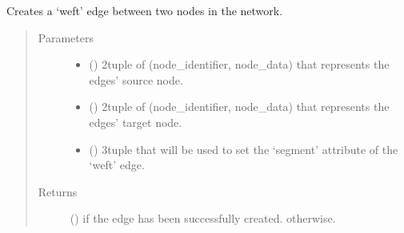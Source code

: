 \documentclass[letterpaper,10pt,english]{sphinxmanual}
\begin{document}
\begin{fulllineitems}

\begin{fulllineitems}
\label{\detokenize{cockatoo:cockatoo.KnitNetworkBase.create_weft_edge}}
Creates a ‘weft’ edge between two nodes in the network.
\begin{quote}\begin{description}
\item[{Parameters}] \leavevmode\begin{itemize}
\item {} 
 () \textendash{} 2\sphinxhyphen{}tuple of (node\_identifier, node\_data) that represents the edges’
source node.

\item {} 
 () \textendash{} 2\sphinxhyphen{}tuple of (node\_identifier, node\_data) that represents the edges’
target node.

\item {} 
 () \textendash{} 3\sphinxhyphen{}tuple that will be used to set the ‘segment’ attribute of the
‘weft’ edge.

\end{itemize}

\item[{Returns}] \leavevmode
{} () \textendash{}  if the edge has been successfully created.
 otherwise.

\end{description}\end{quote}

\end{fulllineitems}



\end{fulllineitems}
\end{document}
